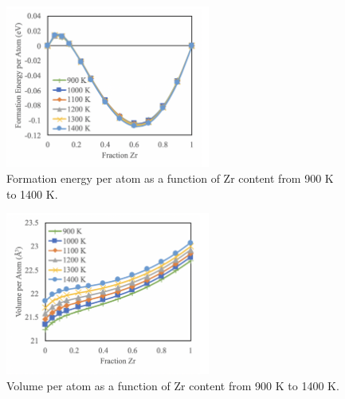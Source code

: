 \documentclass[review]{elsarticle}
\begin{document}
\begin{figure}[!htp]
\begin{center}
\includegraphics[width=0.6\textwidth]{2_Efperat}
\end{center}
\caption{Formation energy per atom as a function of Zr content from 900 K to 1400 K.  }
\label{fig:Efperat}
\end{figure}

\begin{figure}[!htp]
\begin{center}
\includegraphics[width=0.6\textwidth]{3_Vperat}
\end{center}
\caption{Volume per atom as a function of Zr content from 900 K to 1400 K.  }
\label{fig:Vperat}
\end{figure}

\FloatBarrier
\end{document}
